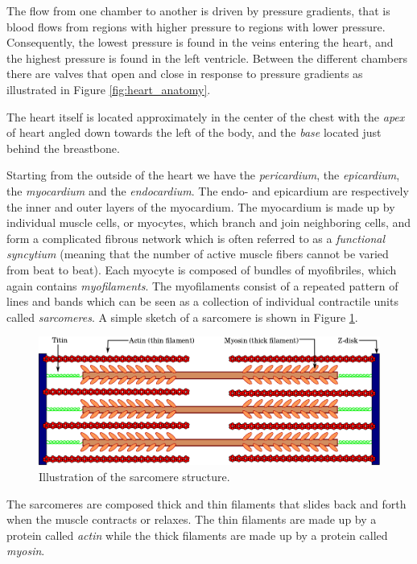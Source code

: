The flow from one chamber to another is driven
by pressure gradients, that is blood flows from regions with higher
pressure to regions with lower pressure. Consequently, the lowest
pressure is found in the veins entering the heart, and the highest
pressure is found in the left ventricle. Between the different
chambers there are valves that open and close in response to pressure
gradients as illustrated in Figure \ref{fig:heart_anatomy}.


The heart itself is located approximately in the center of the chest
with the \emph{apex} of heart angled down towards the left of the
body, and the \emph{base} located just behind the breastbone.


Starting from the outside of the heart we have the \emph{pericardium},
the \emph{epicardium}, the \emph{myocardium} and the \emph{endocardium}. 
The endo- and epicardium are respectively the inner and outer layers of the
myocardium. The myocardium is made up by individual muscle cells, or
myocytes, which branch and join neighboring cells, and form a
complicated fibrous network which is often referred to as a 
\emph{functional syncytium} (meaning that the number of active muscle
fibers cannot be varied from beat to beat). Each myocyte is composed
of bundles of myofibriles, which again contains
\emph{myofilaments}. The myofilaments consist of a repeated pattern
of lines and bands which can be seen as a collection of individual
contractile units called \emph{sarcomeres}. A simple sketch of a
sarcomere is shown in Figure \ref{fig:sarcomere}. 
\begin{figure}[htbp]
  \centering
    \includegraphics[width=1.0\textwidth]{chapters/introduction/figures/Sarcomere.png}
\caption{Illustration of the sarcomere structure.}
\label{fig:sarcomere}
\end{figure}

The sarcomeres are composed thick and thin filaments that slides
back and forth when the muscle contracts or relaxes.
The thin filaments are made up by a protein called \emph{actin} while
the thick filaments are made up by a protein called \emph{myosin}.

